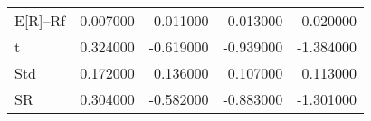 \begin{tabular}{lrrrr}
\toprule
\midrule
E[R]--Rf & 0.007000 & -0.011000 & -0.013000 & -0.020000 \\
t & 0.324000 & -0.619000 & -0.939000 & -1.384000 \\
Std & 0.172000 & 0.136000 & 0.107000 & 0.113000 \\
SR & 0.304000 & -0.582000 & -0.883000 & -1.301000 \\
\bottomrule
\end{tabular}
